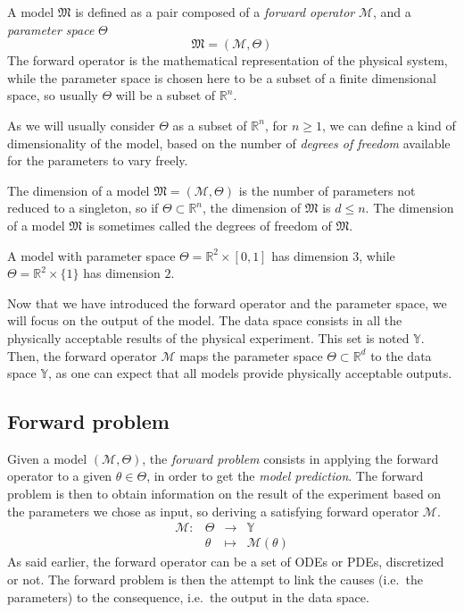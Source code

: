 \documentclass[a4paper,11pt]{article}
\newcommand{\Yspace}{\mathbb{Y}}
\theoremstyle{defi}
\numberwithin{thmCounter}{section}
\begin{document}
\begin{definition}[Model]
  A model $\mathfrak{M}$ is defined as a pair composed of a \emph{forward operator} $\mathcal{M}$, and a \emph{parameter space} $\Theta$
  \begin{equation*}
    \mathfrak{M} = (\mathcal{M}, \Theta)
  \end{equation*}
The forward operator is the mathematical representation of the physical system, while the parameter space is chosen here to be a subset of a finite dimensional space, so usually $\Theta$ will be a subset of $\mathbb{R}^n$.
\end{definition}
As we will usually consider $\Theta$ as a subset of $\mathbb{R}^n$, for $n\geq 1$, we can define a kind of dimensionality of the model, based on the number of \emph{degrees of freedom} available for the parameters to vary freely.
\begin{remark}
  The dimension of a model $\mathfrak{M}=(\mathcal{M},\Theta)$ is the number of parameters not reduced to a singleton, so if $\Theta \subset \mathbb{R}^n$, the dimension of $\mathfrak{M}$ is $d \leq n$. The dimension of a model $\mathfrak{M}$ is sometimes called the degrees of freedom of $\mathfrak{M}$.
  \end{remark}
  
\begin{example}
  A model with parameter space $\Theta = \mathbb{R}^2\times [0, 1]$ has dimension $3$, while $\Theta = \mathbb{R}^2 \times \{1\}$ has dimension $2$.
\end{example}
 Now that we have introduced the forward operator and the parameter space, we will focus on the output of the model.
The data space consists in all the physically acceptable results of the physical experiment. This set is noted $\Yspace$.
Then, the forward operator $\mathcal{M}$ maps the parameter space $\Theta \subset \mathbb{R}^{d}$ to the data space $\Yspace$, as one can expect that all models provide physically acceptable outputs.

\subsection{Forward problem}
Given a model $(\mathcal{M}, \Theta)$, the \emph{forward problem} consists in applying the forward operator to a given $\theta \in \Theta$, in order to get the \emph{model prediction}. The forward problem is then to obtain information on the result of the experiment based on the parameters we chose as input, so deriving a satisfying forward operator $\mathcal{M}$.
\begin{equation*}
  \begin{array}{cccc}
    \mathcal{M}:& \Theta &\longrightarrow & \Yspace \\
                & \theta &\longmapsto     & \mathcal{M}(\theta)
  \end{array}
\end{equation*}
As said earlier, the forward operator can be a set of ODEs or PDEs, discretized or not. The forward problem is then the attempt to link the causes (i.e.\ the parameters) to the consequence, i.e.\ the output in the data space.
\end{document}
